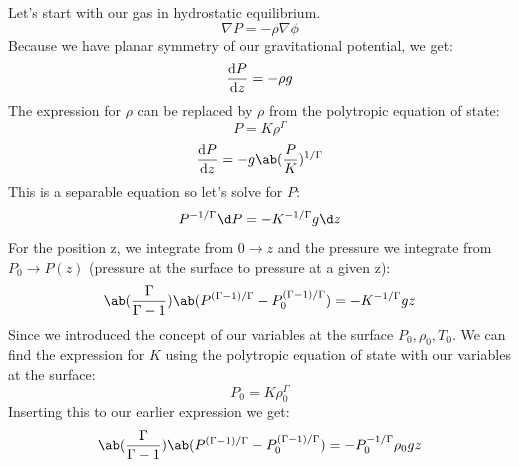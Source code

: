 Let's start with our gas in hydrostatic equilibrium.
\begin{equation}
    \nabla P = -\rho\nabla\phi
\end{equation}
Because we have planar symmetry of our gravitational potential, we get:
\begin{equation}
    \odv{P}{z} = -\rho g
\end{equation}
The expression for $\rho$ can be replaced by $\rho$ from the polytropic equation of state:
\begin{equation}
    P = K \rho^\Gamma
\end{equation}
\begin{equation}
    \odv{P}{z} = -g\ab(\frac{P}{K})^{1/\Gamma}
\end{equation}
This is a separable equation so let's solve for $P$:
\begin{equation}
    P^{-1/\Gamma} \d P = -K^{-1/\Gamma} g\d z
\end{equation}
For the position z, we integrate from $0\rightarrow z$ and the pressure we integrate from $P_0\rightarrow P(z)$ (pressure at the surface to pressure at a given z):
\begin{equation}
    \ab(\frac{\Gamma}{\Gamma - 1})\ab(P^{(\Gamma - 1)/\Gamma} - P_0^{(\Gamma - 1)/\Gamma}) = -K^{-1/\Gamma}g z
\end{equation}
Since we introduced the concept of our variables at the surface $P_0, \rho_0, T_0$. We can find the expression for $K$ using the polytropic equation of state with our variables at the surface:
\begin{equation}
    P_0 = K\rho_0^{\Gamma}
\end{equation}
Inserting this to our earlier expression we get:
\begin{equation}
    \ab(\frac{\Gamma}{\Gamma - 1})\ab(P^{(\Gamma - 1)/\Gamma} - P_0^{(\Gamma - 1)/\Gamma}) = -P_0^{-1/\Gamma}\rho_0g z
\end{equation}
